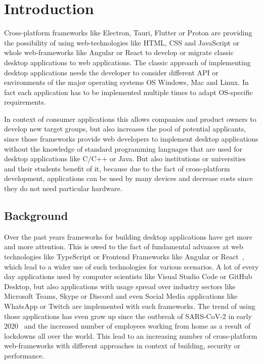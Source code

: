 \section{Introduction}
\label{sec:introduction}
Cross-platform frameworks like Electron, Tauri, Flutter or Proton are providing the possibility of using web-technologies like \ac{HTML}, \ac{CSS} and JavaScript or whole web-frameworks
like Angular or React to develop or migrate classic desktop applications to web applications.
The classic approach of implementing desktop applications needs the developer to consider different \ac{API} or environments of the major operating systems \ac{OS}
Windows, Mac and Linux.
In fact each application has to be implemented multiple times to adapt OS-specific requirements.

In context of consumer applications this allows companies and product owners to develop new target groups, but also increases the pool of potential applicants,
since those frameworks provide web developers to implement desktop applications without the knowledge of standard programming languages that are used for desktop applications
like C/C++ or Java.
But also institutions or universities and their students benefit of it, because due to the fact of cross-platform development, applications can be used by many devices and decrease costs
since they do not need particular hardware.


\subsection{Background}\label{subsec:background}
Over the past years frameworks for building desktop applications have get more and more attention.
This is owed to the fact of fundamental advances at web technologies like TypeScript or Frontend Frameworks like Angular or React~\cite{pernice:icalepcs2019-wempr006},
which lead to a wider use of such technologies for various scenarios.
A lot of every day applications used by computer scientists like Visual Studio Code or GitHub Desktop, but also applications with usage spread over industry sectors
like Microsoft Teams, Skype or Discord and even Social Media applications like WhatsApp or Twitch are implemented with such frameworks.
The trend of using those applications has even grow up since the outbreak of SARS-CoV-2 in early 2020~\cite{Gorbalenya2020} and the increased number of employees working from home
as a result of lockdowns all over the world.
This lead to an increasing number of cross-platform web-frameworks with different approaches in context of building, security or performance.

